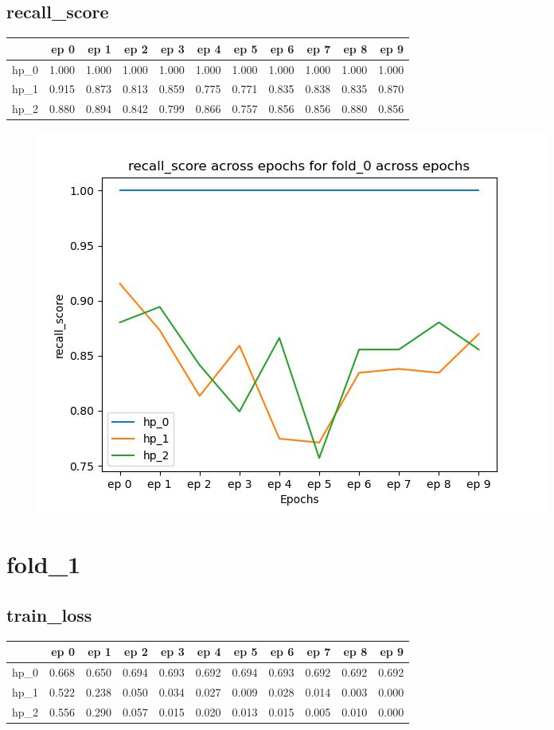 \documentclass{article}
\begin{document}
\subsection{recall\_score}
\begin{tabular}{lrrrrrrrrrr}
\toprule
{} &   ep 0 &   ep 1 &   ep 2 &   ep 3 &   ep 4 &   ep 5 &   ep 6 &   ep 7 &   ep 8 &   ep 9 \\
\midrule
hp\_0 &  1.000 &  1.000 &  1.000 &  1.000 &  1.000 &  1.000 &  1.000 &  1.000 &  1.000 &  1.000 \\
hp\_1 &  0.915 &  0.873 &  0.813 &  0.859 &  0.775 &  0.771 &  0.835 &  0.838 &  0.835 &  0.870 \\
hp\_2 &  0.880 &  0.894 &  0.842 &  0.799 &  0.866 &  0.757 &  0.856 &  0.856 &  0.880 &  0.856 \\
\bottomrule
\end{tabular}

\begin{figure}[H]
\includegraphics[scale = 0.75]{fold_0/recall_score}
\end{figure}
\section{fold\_1}
\subsection{train\_loss}
\begin{tabular}{lrrrrrrrrrr}
\toprule
{} &   ep 0 &   ep 1 &   ep 2 &   ep 3 &   ep 4 &   ep 5 &   ep 6 &   ep 7 &   ep 8 &   ep 9 \\
\midrule
hp\_0 &  0.668 &  0.650 &  0.694 &  0.693 &  0.692 &  0.694 &  0.693 &  0.692 &  0.692 &  0.692 \\
hp\_1 &  0.522 &  0.238 &  0.050 &  0.034 &  0.027 &  0.009 &  0.028 &  0.014 &  0.003 &  0.000 \\
hp\_2 &  0.556 &  0.290 &  0.057 &  0.015 &  0.020 &  0.013 &  0.015 &  0.005 &  0.010 &  0.000 \\
\bottomrule
\end{tabular}
\end{document}
